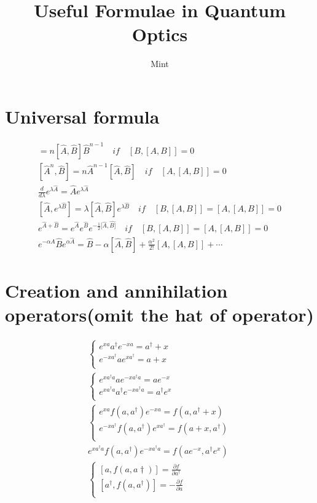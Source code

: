 \documentclass{article}  %
\title{Useful Formulae in Quantum Optics}  %
\author{Mint}  %
\begin{document}
  

\maketitle %

\section{Universal formula}

\begin{gather}%
[\hat{A},\hat{B}^n]=n[\hat{A},\hat{B}]\hat{B}^{n-1} \quad if \quad [B,[A,B]]=0  \\
[\hat{A}^n,\hat{B}]=n\hat{A}^{n-1}[\hat{A},\hat{B}] \quad if \quad [A,[A,B]]=0 \\
\frac{d}{d\lambda}e^{\lambda \hat{A}}=\hat{A}e^{\lambda\hat{A}}  \\
[\hat{A},e^{\lambda\hat{B}}]=\lambda[\hat{A},\hat{B}]e^{\lambda\hat{B}} \quad if \quad [B,[A,B]]=[A,[A,B]]=0 \\
e^{\hat{A}+\hat{B}}=e^{\hat{A}}e^{\hat{B}}e^{-\frac{1}{2}[\hat{A},\hat{B]}} \quad if \quad [B,[A,B]]=[A,[A,B]]=0\\
e^{-\alpha\hat{A}}\hat{B}e^{\alpha\hat{A}}=\hat{B}-\alpha[\hat{A},\hat{B}]+\frac{\alpha^2}{2!}[A,[A,B]]+\cdots
\end{gather}
\section{Creation and annihilation operators(omit the hat of operator)}

\begin{gather}
\begin{cases}
e^{xa}a^\dagger e^{-xa}=a^\dagger+x\\
e^{-xa^\dagger}ae^{xa^\dagger}=a+x\\
\end{cases}\\
\begin{cases}
e^{xa^\dagger a}ae^{-xa^\dagger a}=ae^{-x}\\
e^{xa^\dagger a}a^\dagger e^{-xa^\dagger a}=a^\dagger e^{x}\\
\end{cases}\\
\begin{cases}
e^{xa}f(a,a^\dagger)e^{-xa}=f(a,a^\dagger+x)\\
e^{-xa^\dagger}f(a,a^\dagger)e^{xa^\dagger}=f(a+x,a^\dagger)\\
\end{cases}\\
e^{xa^\dagger a}f(a,a^\dagger)e^{-xa^\dagger a}=f(ae^{-x},a^\dagger e^{x})\\
\begin{cases}
[a,f(a,a\dagger)]=\frac{\partial f}{\partial a^\dagger}\\
[a^\dagger,f(a,a^\dagger)]=-\frac{\partial f}{\partial a}\\
\end{cases}
\end{gather}
\end{document}
